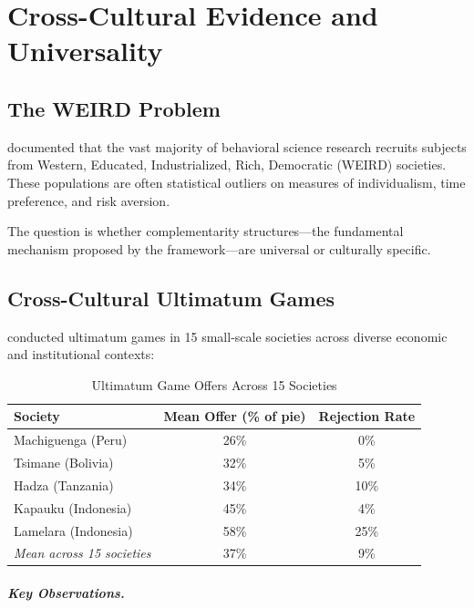 \documentclass[12pt,oneside]{book}
\begin{document}
\chapter{Cross-Cultural Evidence and Universality}
\label{sec:cross-cultural}

\section{The WEIRD Problem}

\citet{henrich2010} documented that the vast majority of behavioral science research recruits
subjects from Western, Educated, Industrialized, Rich, Democratic (WEIRD) societies. These
populations are often statistical outliers on measures of individualism, time preference, and
risk aversion.

The question is whether complementarity structures—the fundamental mechanism proposed by the
framework—are universal or culturally specific.

\section{Cross-Cultural Ultimatum Games}

\citet{henrich2000} conducted ultimatum games in 15 small-scale societies across diverse economic
and institutional contexts:

\begin{table}[htbp]
\centering
\caption{Ultimatum Game Offers Across 15 Societies}
\label{tab:cross-cultural}
\begin{tabular}{@{}lcc@{}}
\toprule
\textbf{Society} & \textbf{Mean Offer (\% of pie)} & \textbf{Rejection Rate} \\
\midrule
Machiguenga (Peru) & 26\% & 0\% \\
Tsimane (Bolivia) & 32\% & 5\% \\
Hadza (Tanzania) & 34\% & 10\% \\
Kapauku (Indonesia) & 45\% & 4\% \\
Lamelara (Indonesia) & 58\% & 25\% \\
\midrule
\textit{Mean across 15 societies} & 37\% & 9\% \\
\bottomrule
\end{tabular}
\end{table}

\paragraph{Key Observations.}
\end{document}
